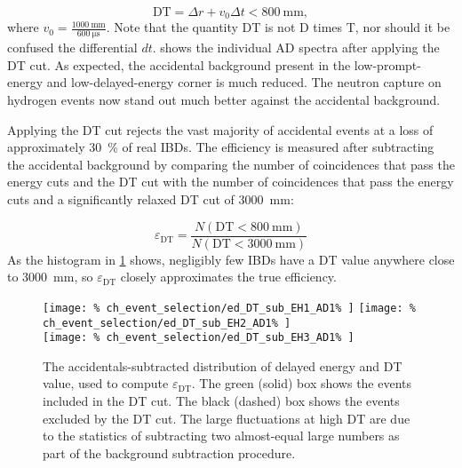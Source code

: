\begin{equation}
    \text{DT} = \Delta r + v_0 \Delta t < \SI{800}{\milli\meter},
\end{equation}
where $v_0 = \frac{\SI{1000}{\milli\meter}}{\SI{600}{\micro\second}}$.
Note that the quantity DT is not D times T,
nor should it be confused the differential $dt$.
 shows the individual AD spectra
after applying the DT cut.
As expected, the accidental background present
in the low-prompt-energy and low-delayed-energy corner is much reduced.
The neutron capture on hydrogen events now stand out much better
against the accidental background.


Applying the DT cut rejects the vast majority of accidental events
at a loss of approximately \SI{30}{\percent} of real IBDs.
The efficiency is measured after subtracting the accidental background
by comparing the number of  coincidences that pass the energy cuts and the DT cut
with the number of  coincidences that pass the energy cuts
and a significantly relaxed DT cut of \SI{3000}{\milli\meter}:

\begin{equation}
    \varepsilon_{\text{DT}} = \frac{N(\text{DT} < \SI{800}{\milli\meter})}{
    N(\text{DT} < \SI{3000}{\milli\meter})}
\end{equation}
As the histogram in \cref{fig:ed_DT_sub} shows,
negligibly few IBDs have a DT value anywhere close to \SI{3000}{\milli\meter},
so $\varepsilon_{\text{DT}}$ closely approximates the true efficiency.

\begin{figure}
    \centering
    \texttt{[image: \%
        ch\_event\_selection/ed\_DT\_sub\_EH1\_AD1\%
    ]}
    \texttt{[image: \%
        ch\_event\_selection/ed\_DT\_sub\_EH2\_AD1\%
    ]} \\
    \texttt{[image: \%
        ch\_event\_selection/ed\_DT\_sub\_EH3\_AD1\%
    ]}
    \caption{
        The accidentals-subtracted distribution of
        delayed energy and DT value, used to compute $\varepsilon_{\text{DT}}$.
        The green (solid) box shows the events included in the DT cut.
        The black (dashed) box shows the events excluded by the DT cut.
        The large fluctuations at high DT are due to the statistics
        of subtracting two almost-equal large numbers as part of the
        background subtraction procedure.
    }
    \label{fig:ed_DT_sub}
\end{figure}

